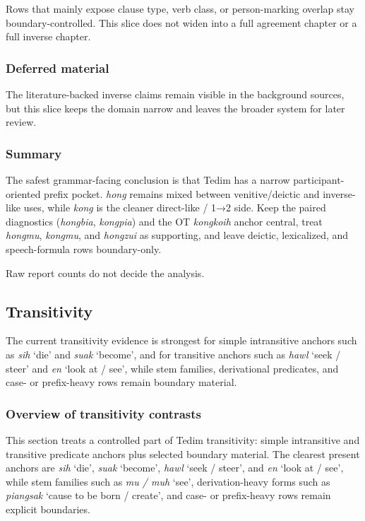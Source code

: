 \documentclass[
  11pt,
  a4paper,
]{article}
\newcommand{\tdim}[1]{\textit{#1}}
\newcommand{\glossquote}[1]{`#1'}
\begin{document}
Rows that mainly expose clause type, verb class, or person-marking
overlap stay boundary-controlled. This slice does not widen into a full
agreement chapter or a full inverse chapter.

\subsubsection{Deferred material}\label{deferred-material-6}

The literature-backed inverse claims remain visible in the background
sources, but this slice keeps the domain narrow and leaves the broader
system for later review.

\subsubsection{Summary}\label{summary-3}

The safest grammar-facing conclusion is that Tedim has a narrow
participant-oriented prefix pocket. \tdim{hong} remains mixed between
venitive/deictic and inverse-like uses, while \tdim{kong} is the cleaner
direct-like / 1→2 side. Keep the paired diagnostics (\tdim{hongbia},
\tdim{kongpia}) and the OT \tdim{kongkoih} anchor central, treat
\tdim{hongmu}, \tdim{kongmu}, and \tdim{hongzui} as supporting, and
leave deictic, lexicalized, and speech-formula rows boundary-only.

Raw report counts do not decide the analysis.

\subsection{Transitivity}\label{transitivity}

The current transitivity evidence is strongest for simple intransitive
anchors such as \tdim{sih} \glossquote{die} and \tdim{suak}
\glossquote{become}, and for transitive anchors such as \tdim{hawl}
\glossquote{seek / steer} and \tdim{en} \glossquote{look at / see},
while stem families, derivational predicates, and case- or prefix-heavy
rows remain boundary material.

\subsubsection{Overview of transitivity
contrasts}\label{overview-of-transitivity-contrasts}

This section treats a controlled part of Tedim transitivity: simple
intransitive and transitive predicate anchors plus selected boundary
material. The clearest present anchors are \tdim{sih} \glossquote{die},
\tdim{suak} \glossquote{become}, \tdim{hawl} \glossquote{seek / steer},
and \tdim{en} \glossquote{look at / see}, while stem families such as
\tdim{mu / muh} \glossquote{see}, derivation-heavy forms such as
\tdim{piangsak} \glossquote{cause to be born / create}, and case- or
prefix-heavy rows remain explicit boundaries.
\end{document}
